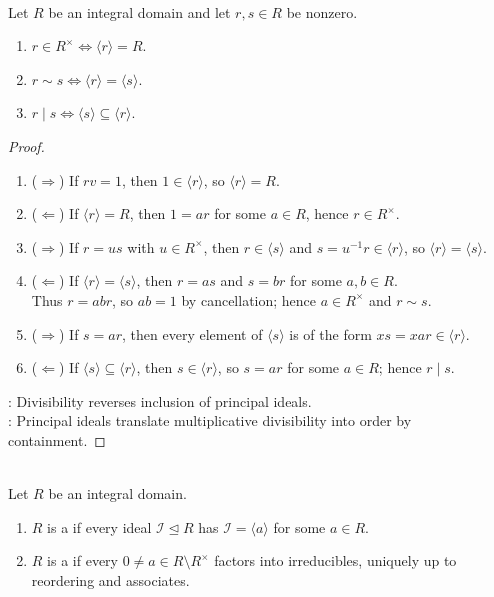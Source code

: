 \begin{proposition} \label{prop:principal-ideals-divisibility-associates} \\
Let $R$ be an integral domain and let $r,s\in R$ be nonzero.
\begin{enumerate}[label=(\roman*)]
\setlength{\itemsep}{0pt}
\item $r\in R^\times \Longleftrightarrow \langle r\rangle=R$.
\item $r\sim s \Longleftrightarrow \langle r\rangle=\langle s\rangle$.
\item $r\mid s \Longleftrightarrow \langle s\rangle\subseteq\langle r\rangle$.
\end{enumerate}
\begin{proof}
\begin{enumerate}[label=(\roman*).]
\setlength{\itemsep}{0pt}
\item[$(i)$]($\Rightarrow$) If $rv=1$, then $1\in\langle r\rangle$, so $\langle r\rangle=R$.
\item[$(i)$]($\Leftarrow$) If $\langle r\rangle=R$, then $1=ar$ for some $a\in R$, hence $r\in R^\times$.
\item[$(ii)$]($\Rightarrow$) If $r=us$ with $u\in R^\times$, then $r\in\langle s\rangle$ and $s=u^{-1}r\in\langle r\rangle$, so $\langle r\rangle=\langle s\rangle$.
\item[$(ii)$]($\Leftarrow$) If $\langle r\rangle=\langle s\rangle$, then $r=as$ and $s=br$ for some $a,b\in R$.\\
Thus $r=abr$, so $ab=1$ by cancellation; hence $a\in R^\times$ and $r\sim s$.
\item[$(iii)$]($\Rightarrow$) If $s=ar$, then every element of $\langle s\rangle$ is of the form $xs=xar\in\langle r\rangle$.
\item[$(iii)$]($\Leftarrow$) If $\langle s\rangle\subseteq\langle r\rangle$, then $s\in\langle r\rangle$, so $s=ar$ for some $a\in R$; hence $r\mid s$.
\end{enumerate}
: Divisibility reverses inclusion of principal ideals.\\
: Principal ideals translate multiplicative divisibility into order by containment.
\end{proof}
\end{proposition}

\begin{definition} \label{def:principal-ideal-domain-and-ufd} \\
Let $R$ be an integral domain.
\begin{enumerate}[label=(\roman*)]
\setlength{\itemsep}{0pt}
\item $R$ is a  if every ideal $\mathcal{I}\trianglelefteq R$ has $\mathcal{I}=\langle a\rangle$ for some $a\in R$.
\item $R$ is a  if every $0\neq a\in R\setminus R^\times$ factors into irreducibles, uniquely up to reordering and associates.
\end{enumerate}
\end{definition}

